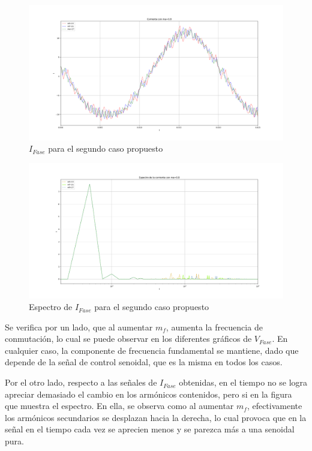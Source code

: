 \documentclass[e4_tp3_main.tex]{subfiles}
\begin{document}
\begin{figure}[H]
\centering
\includegraphics[width=0.9\linewidth]{Imagenes/Ej2c_I.png}
\caption{$I_{Fase}$ para el segundo caso propuesto}
\end{figure}



\begin{figure}[H]
\centering
\includegraphics[width=0.9\linewidth]{Imagenes/Ej2cfft.png}
\caption{Espectro de $I_{Fase}$ para el segundo caso propuesto}
\end{figure}
Se verifica por un lado, que al aumentar $m_f$, aumenta la frecuencia de conmutación, lo cual se puede observar en los diferentes gráficos de $V_{Fase}$. En cualquier caso, la componente de frecuencia fundamental se mantiene, dado que depende de la señal de control senoidal, que es la misma en todos los casos.\par
Por el otro lado, respecto a las señales de $I_{Fase}$ obtenidas, en el tiempo no se logra apreciar demasiado el cambio en los armónicos contenidos, pero si en la figura que muestra el espectro. En ella, se observa como al aumentar $m_f$, efectivamente los armónicos secundarios se desplazan hacia la derecha, lo cual provoca que en la señal en el tiempo cada vez se aprecien menos y se parezca más a una senoidal pura.
\end{document}
